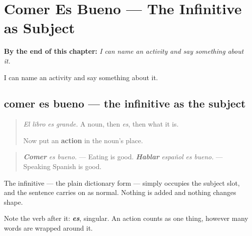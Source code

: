 
\chapter{Comer Es Bueno --- The Infinitive as Subject}
\label{ch:comer-es-bueno}

\begin{chapteropening}
\textbf{By the end of this chapter:} \emph{I can name an activity and say something about it.}

I can name an activity and say something about it.
\end{chapteropening}

\section[comer es bueno]{comer es bueno — the infinitive as the subject}

\label{lesson:ES-C67-comer-es-bueno}



\begin{quote}
\emph{El libro es grande.} A noun, then \emph{es}, then what it is.

Now put an \textbf{action} in the noun's place.
\end{quote}

\begin{grammarlens}[title={Grammar Lens: the infinitive stands there}]
\begin{quote}
\emph{\textbf{Comer}} \emph{es bueno.} — Eating is good. \emph{\textbf{Hablar}} \emph{español es bueno.} — Speaking Spanish is good.
\end{quote}

The infinitive — the plain dictionary form — simply occupies the subject slot, and the sentence carries on as normal. Nothing is added and nothing changes shape.

Note the verb after it: \emph{\textbf{es}}, singular. An action counts as one thing, however many words are wrapped around it.
\end{grammarlens}

